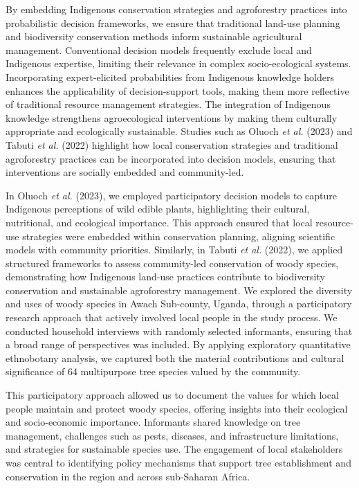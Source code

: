 \documentclass[
]{article}
\begin{document}
By embedding Indigenous conservation strategies and agroforestry
practices into probabilistic decision frameworks, we ensure that
traditional land-use planning and biodiversity conservation methods
inform sustainable agricultural management. Conventional decision models
frequently exclude local and Indigenous expertise, limiting their
relevance in complex socio-ecological systems. Incorporating
expert-elicited probabilities from Indigenous knowledge holders enhances
the applicability of decision-support tools, making them more reflective
of traditional resource management strategies. The integration of
Indigenous knowledge strengthens agroecological interventions by making
them culturally appropriate and ecologically sustainable. Studies such
as Oluoch \emph{et al.} (2023) and Tabuti \emph{et al.} (2022) highlight
how local conservation strategies and traditional agroforestry practices
can be incorporated into decision models, ensuring that interventions
are socially embedded and community-led.

In Oluoch \emph{et al.} (2023), we employed participatory decision
models to capture Indigenous perceptions of wild edible plants,
highlighting their cultural, nutritional, and ecological importance.
This approach ensured that local resource-use strategies were embedded
within conservation planning, aligning scientific models with community
priorities. Similarly, in Tabuti \emph{et al.} (2022), we applied
structured frameworks to assess community-led conservation of woody
species, demonstrating how Indigenous land-use practices contribute to
biodiversity conservation and sustainable agroforestry management. We
explored the diversity and uses of woody species in Awach Sub-county,
Uganda, through a participatory research approach that actively involved
local people in the study process. We conducted household interviews
with randomly selected informants, ensuring that a broad range of
perspectives was included. By applying exploratory quantitative
ethnobotany analysis, we captured both the material contributions and
cultural significance of 64 multipurpose tree species valued by the
community.

This participatory approach allowed us to document the values for which
local people maintain and protect woody species, offering insights into
their ecological and socio-economic importance. Informants shared
knowledge on tree management, challenges such as pests, diseases, and
infrastructure limitations, and strategies for sustainable species use.
The engagement of local stakeholders was central to identifying policy
mechanisms that support tree establishment and conservation in the
region and across sub-Saharan Africa.
\end{document}

